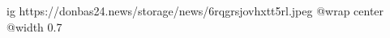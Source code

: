  
 
 
 
 

\ifcmt
  ig https://donbas24.news/storage/news/6rqgrsjovhxtt5rl.jpeg
  @wrap center
  @width 0.7
\fi
